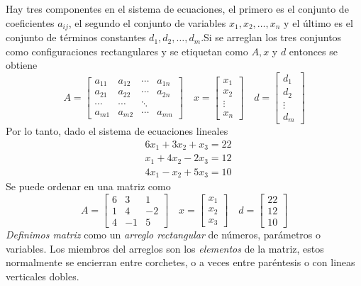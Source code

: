 Hay tres componentes en el sistema de ecuaciones, el primero es el conjunto de coeficientes \(a_{ij}\), el segundo el conjunto de variables \(x_1,x_2,\dots,x_n\) y el último es el conjunto de términos constantes \(d_1, d_2, \dots, d_m\).Si se arreglan los tres conjuntos como configuraciones rectangulares y se etiquetan como \(A,x\) y \(d\) entonces se obtiene
\[
A = \begin{bmatrix}
a_{11} & a_{12} & \cdots & a_{1n} \\
a_{21} & a_{22} & \cdots & a_{2n} \\
\cdots  & \cdots  & \ddots \\
a_{m1} & a_{m2} & \cdots & a_{mn}
\end{bmatrix}
\quad
x = \begin{bmatrix}
x_1 \\ 
x_2 \\
\vdots \\
x_n
\end{bmatrix}
\quad
d = \begin{bmatrix}
d_1 \\
d_2 \\
\vdots \\ 
d_m
\end{bmatrix}
\]
Por lo tanto, dado el sistema de ecuaciones lineales 
$$
\begin{aligned}
    & 6x_1 + 3x_2 + x_3 = 22 \\
    & x_1 + 4x_2 - 2x_3 = 12 \\
    & 4x_1 - x_2 + 5x_3 = 10
\end{aligned}
$$
Se puede ordenar en una matriz como 
\[
A = \begin{bmatrix}
6 & 3 & 1 \\
1 & 4 & -2 \\
4 & -1 & 5
\end{bmatrix}
\quad
x = \begin{bmatrix}
x_1 \\ 
x_2 \\
x_3
\end{bmatrix}
\quad
d = \begin{bmatrix}
22 \\
12 \\
10
\end{bmatrix}
\]
\textit{Definimos matriz} como un \textit{arreglo rectangular} de números, parámetros o variables. Los miembros del arreglos son los \textit{elementos} de la matriz, estos normalmente se encierran entre corchetes, o a veces entre paréntesis o con lineas verticales dobles.

